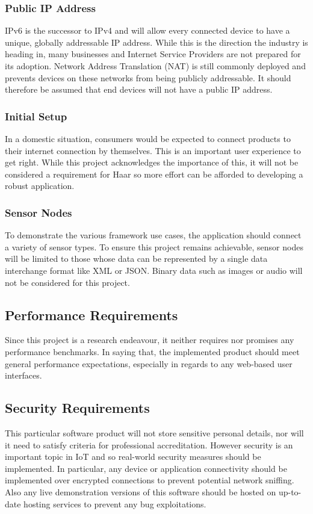       \subsubsection{Public IP Address}
        IPv6 is the successor to IPv4 and will allow every connected device to have a unique, globally addressable IP address. While this is the direction the industry is heading in, many businesses and Internet Service Providers are not prepared for its adoption. Network Address Translation (NAT) is still commonly deployed and prevents devices on these networks from being publicly addressable. It should therefore be assumed that end devices will not have a public IP address.

      \subsubsection{Initial Setup}
        In a domestic situation, consumers would be expected to connect products to their internet connection by themselves. This is an important user experience to get right. While this project acknowledges the importance of this, it will not be considered a requirement for Haar so more effort can be afforded to developing a robust application.

      \subsubsection{Sensor Nodes}
        To demonstrate the various framework use cases, the application should connect a variety of sensor types. To ensure this project remains achievable, sensor nodes will be limited to those whose data can be represented by a single data interchange format like XML or JSON. Binary data such as images or audio will not be considered for this project.

    \subsection{Performance Requirements}
      Since this project is a research endeavour, it neither requires nor promises any performance benchmarks. In saying that, the implemented product should meet general performance expectations, especially in regards to any web-based user interfaces.

    \subsection{Security Requirements}
      This particular software product will not store sensitive personal details, nor will it need to satisfy criteria for professional accreditation. However security is an important topic in IoT and so real-world security measures should be implemented. In particular, any device or application connectivity should be implemented over encrypted connections to prevent potential network sniffing. Also any live demonstration versions of this software should be hosted on up-to-date hosting services to prevent any bug exploitations.

